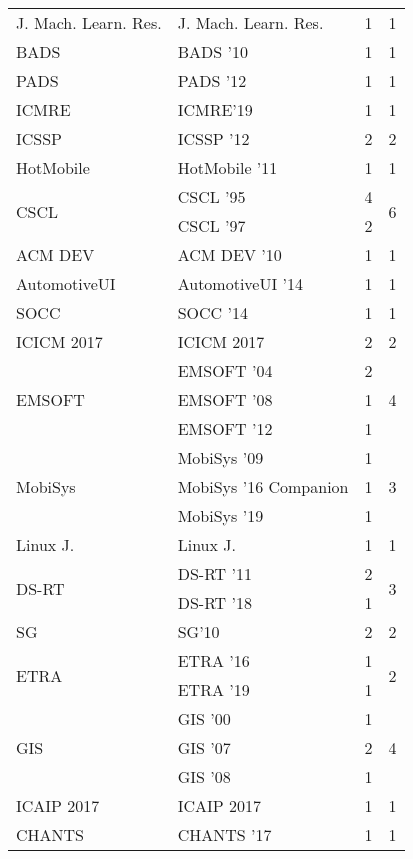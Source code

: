 \begin{table*}[t]
\begin{tabular}{llrr}
\multirow{1}{*}{J. Mach. Learn. Res.} & J. Mach. Learn. Res. & 1 & \multirow{1}{*}{1}\\
\multirow{1}{*}{BADS } & BADS '10 & 1 & \multirow{1}{*}{1}\\
\multirow{1}{*}{PADS } & PADS '12 & 1 & \multirow{1}{*}{1}\\
\multirow{1}{*}{ICMRE} & ICMRE'19 & 1 & \multirow{1}{*}{1}\\
\multirow{1}{*}{ICSSP } & ICSSP '12 & 2 & \multirow{1}{*}{2}\\
\multirow{1}{*}{HotMobile } & HotMobile '11 & 1 & \multirow{1}{*}{1}\\
\multirow{2}{*}{CSCL } & CSCL '95 & 4 & \multirow{2}{*}{6}\\
& CSCL '97 & 2 &\\
\multirow{1}{*}{ACM DEV } & ACM DEV '10 & 1 & \multirow{1}{*}{1}\\
\multirow{1}{*}{AutomotiveUI } & AutomotiveUI '14 & 1 & \multirow{1}{*}{1}\\
\multirow{1}{*}{SOCC } & SOCC '14 & 1 & \multirow{1}{*}{1}\\
\multirow{1}{*}{ICICM 2017} & ICICM 2017 & 2 & \multirow{1}{*}{2}\\
\multirow{3}{*}{EMSOFT } & EMSOFT '04 & 2 & \multirow{3}{*}{4}\\
& EMSOFT '08 & 1 &\\
& EMSOFT '12 & 1 &\\
\multirow{3}{*}{MobiSys } & MobiSys '09 & 1 & \multirow{3}{*}{3}\\
& MobiSys '16 Companion & 1 &\\
& MobiSys '19 & 1 &\\
\multirow{1}{*}{Linux J.} & Linux J. & 1 & \multirow{1}{*}{1}\\
\multirow{2}{*}{DS-RT } & DS-RT '11 & 2 & \multirow{2}{*}{3}\\
& DS-RT '18 & 1 &\\
\multirow{1}{*}{SG} & SG'10 & 2 & \multirow{1}{*}{2}\\
\multirow{2}{*}{ETRA } & ETRA '16 & 1 & \multirow{2}{*}{2}\\
& ETRA '19 & 1 &\\
\multirow{3}{*}{GIS } & GIS '00 & 1 & \multirow{3}{*}{4}\\
& GIS '07 & 2 &\\
& GIS '08 & 1 &\\
\multirow{1}{*}{ICAIP 2017} & ICAIP 2017 & 1 & \multirow{1}{*}{1}\\
\multirow{1}{*}{CHANTS } & CHANTS '17 & 1 & \multirow{1}{*}{1}\\

\end{tabular}
\end{table*}
